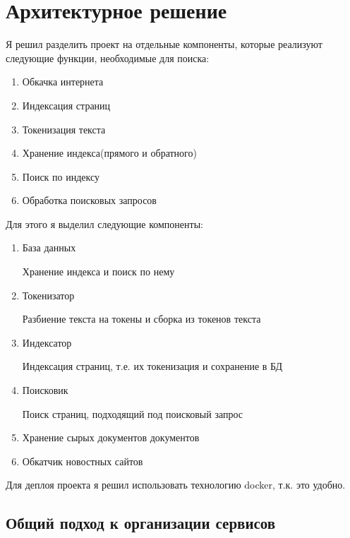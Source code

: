 \section{Архитектурное решение}

Я решил разделить проект на отдельные компоненты, которые реализуют следующие функции, необходимые для поиска:

\begin{enumerate}
\item Обкачка интернета
\item Индексация страниц
\item Токенизация текста
\item Хранение индекса(прямого и обратного)
\item Поиск по индексу
\item Обработка поисковых запросов
\end{enumerate}

Для этого я выделил следующие компоненты:
\begin{enumerate}
\item База данных

	Хранение индекса и поиск по нему
\item Токенизатор

	Разбиение текста на токены и сборка из токенов текста
\item Индексатор

	Индексация страниц, т.е. их токенизация и сохранение в БД
\item Поисковик
	
	Поиск страниц, подходящий под поисковый запрос

\item Хранение сырых документов документов 
\item Обкатчик новостных сайтов
\end{enumerate}


Для деплоя проекта я решил использовать технологию docker, т.к. это удобно.

\subsection{Общий подход к организации сервисов}



